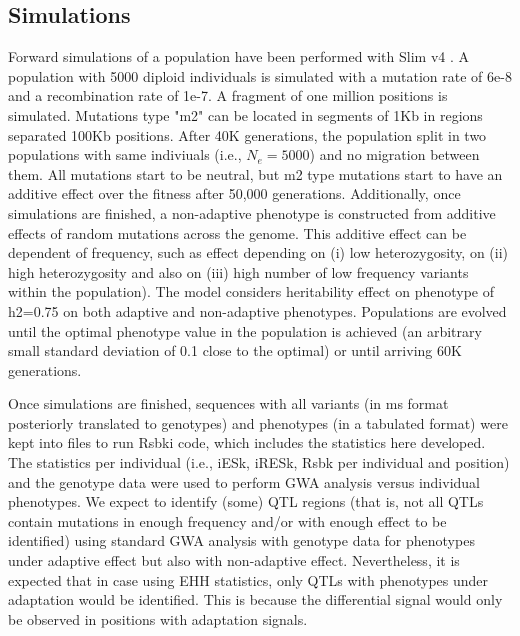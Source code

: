 \documentclass[a4paper,11pt]{article}
\begin{document}
\subsection{Simulations}
Forward simulations of a population have been performed with Slim v4  \citep{Haller:2019aa}. A population with 5000 diploid individuals is simulated with a mutation rate of 6e-8 and a recombination rate of 1e-7. A fragment of one million positions is simulated. Mutations type "m2" can be located  in segments of 1Kb in regions separated 100Kb positions. After 40K generations, the population split in two populations with same indiviuals (i.e., $N_e=5000$) and no migration between them.  All mutations start to be neutral, but m2 type mutations start to have an additive effect over the fitness after 50,000 generations. Additionally, once simulations are finished, a non-adaptive  phenotype is constructed from additive effects of random mutations across the genome. This additive effect can be dependent of frequency, such as effect depending on (i) low heterozygosity, on (ii) high heterozygosity and also on (iii) high number of low frequency variants within the population). The model  considers heritability effect on phenotype of h2=0.75 on both adaptive and non-adaptive phenotypes. Populations are evolved until the optimal phenotype value in the population is achieved (an arbitrary small standard deviation of 0.1 close to the optimal) or until arriving 60K generations.

Once simulations are finished, sequences with all variants (in ms format posteriorly translated to genotypes) and phenotypes (in a tabulated format) were kept into files to run Rsbki code, which includes the statistics here developed. The statistics per individual (i.e., iESk, iRESk, Rsbk per individual and position) and the genotype data were used to perform GWA analysis versus individual phenotypes. We expect to identify (some) QTL regions (that is, not all QTLs contain mutations in enough frequency and/or with enough effect to be identified) using standard GWA analysis with genotype data for phenotypes under adaptive effect but also with non-adaptive effect. Nevertheless, it is expected that in case using EHH statistics, only QTLs with phenotypes under adaptation would be identified. This is because the differential signal would only be observed  in positions with adaptation signals. 

\end{document}

